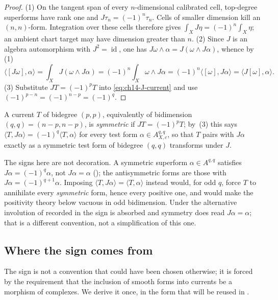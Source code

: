 \begin{proof}
(1) On the tangent span of every $n$-dimensional calibrated cell,
top-degree superforms have rank one and
$J\tau_n=(-1)^n\tau_n$. Cells of smaller dimension kill an $(n,n)$-form.
Integration over these cells therefore gives
$\int_XJ\eta=(-1)^n\int_X\eta$; an ambient chart target may have
dimension greater than $n$.  (2) Since $J$ is an algebra automorphism with
$J^2=\operatorname{id}$, one has $J\omega\wedge\alpha=J(\omega\wedge J\alpha)$,
whence by (1)
\[
 \langle[J\omega],\alpha\rangle
 =\int_XJ(\omega\wedge J\alpha)
 =(-1)^n\int_X\omega\wedge J\alpha
 =(-1)^n\langle[\omega],J\alpha\rangle
 =\langle J[\omega],\alpha\rangle .
\]
(3) Substitute $JT=(-1)^pT$ into \eqref{eq:ch14-J-current} and use
$(-1)^{p-n}=(-1)^{n-p}=(-1)^q$.
\end{proof}

\begin{definition}
\label{def:ch14-symmetric-current}
A current $T$ of bidegree $(p,p)$, equivalently of bidimension
$(q,q)=(n-p,n-p)$, is \emph{symmetric} if $JT=(-1)^pT$; by
\,(3) this says
$\langle T,J\alpha\rangle=(-1)^q\langle T,\alpha\rangle$ for every test form
$\alpha\in A_{X,c}^{q,q}$, so that $T$ pairs with $J\alpha$ exactly as a
symmetric test form of bidegree $(q,q)$ transforms under $J$.
\end{definition}

The signs here are not decoration.  A symmetric superform
$\alpha\in A^{q,q}$ satisfies $J\alpha=(-1)^q\alpha$, not $J\alpha=\alpha$
(); the antisymmetric forms are those with
$J\alpha=(-1)^{q+1}\alpha$.  Imposing $\langle T,J\alpha\rangle
=\langle T,\alpha\rangle$ instead would, for odd $q$, force $T$ to annihilate
every \emph{symmetric} form, hence every positive one, and would make the
positivity theory below vacuous in odd bidimension.  Under the alternative
involution of \cite{CLD25} recorded in  the
sign is absorbed and symmetry does read $J\alpha=\alpha$; that is a different
convention, not a simplification of this one.

\subsection{Where the sign comes from}
\label{sec:ch14-sign-derivation}

The sign is not a convention that could have been chosen otherwise; it is
forced by the requirement that the inclusion of smooth forms into currents be
a morphism of complexes.  We derive it once, in the form that will be reused
in .

